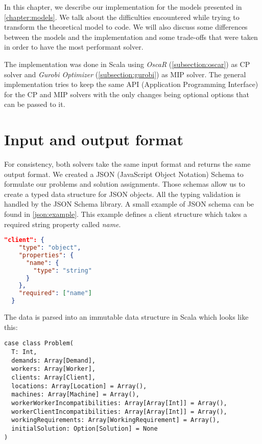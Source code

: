 \documentclass[../thesis.tex]{subfiles}
\begin{document}
In this chapter, we describe our implementation for the models presented in \autoref{chapter:models}. 
We talk about the difficulties encountered while trying to transform the theoretical model to code. 
We will also discuss some differences between the models and the implementation and some trade-offs that were taken in order to 
have the most performant solver.

The implementation was done in Scala using 
\emph{OscaR} (\ref{subsection:oscar}) as CP solver and
\emph{Gurobi Optimizer} (\ref{subsection:gurobi}) as MIP solver. The general implementation 
tries to keep the same API (Application Programming Interface) for the CP and MIP solvers with the only changes being optional options 
that can be passed to it. 



\section{Input and output format}

For consistency, both solvers take the same input format and returns the same output format.
We created a JSON (JavaScript Object Notation) Schema \cite{json:schema} to formulate our problems and solution assignments.
Those schemas allow us to create a typed data structure for JSON objects. All the typing validation 
is handled by the JSON Schema library. A small example of JSON schema can be found in \autoref{json:example}. 
This example defines a client structure which takes a required string property called \textit{name}.


\begin{lstlisting}[language=json,firstnumber=1,caption={JSON Schema example},captionpos=b,label={json:example}]
  "client": {
    "type": "object",
    "properties": {
      "name": {
        "type": "string"
      }
    },
    "required": ["name"]
  }
\end{lstlisting}

The data is parsed into an immutable data structure in Scala which looks like this:

\begin{lstlisting}[style=scalaStyle,caption={Problem structure in Scala},captionpos=b]
case class Problem(
  T: Int,
  demands: Array[Demand],
  workers: Array[Worker],
  clients: Array[Client],
  locations: Array[Location] = Array(),
  machines: Array[Machine] = Array(),
  workerWorkerIncompatibilities: Array[Array[Int]] = Array(),
  workerClientIncompatibilities: Array[Array[Int]] = Array(),
  workingRequirements: Array[WorkingRequirement] = Array(),
  initialSolution: Option[Solution] = None
)
\end{lstlisting}
\end{document}
